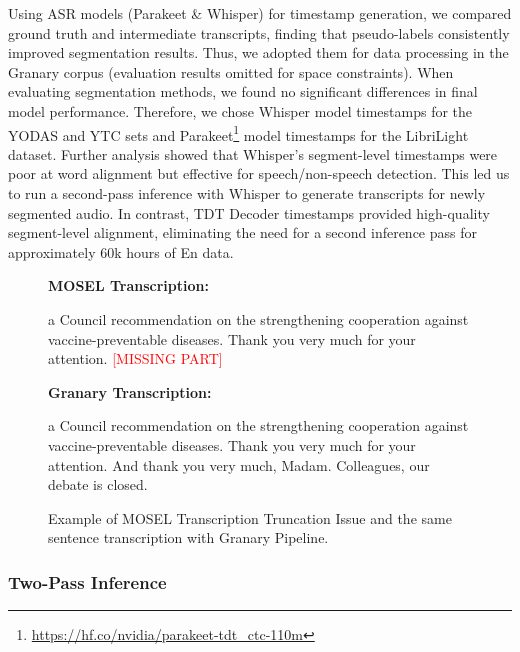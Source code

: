 Using ASR models (Parakeet\cite{rekesh2023fast} \& Whisper) for timestamp generation, we compared ground truth and intermediate transcripts, finding that pseudo-labels consistently improved segmentation results. Thus, we adopted them for data processing in the Granary corpus (evaluation results omitted for space constraints). When evaluating segmentation methods, we found no significant differences in final model performance. Therefore, we chose Whisper model timestamps for the YODAS and YTC sets and Parakeet\footnote{\url{https://hf.co/nvidia/parakeet-tdt_ctc-110m}} model timestamps for the LibriLight dataset. Further analysis showed that Whisper's segment-level timestamps were poor at word alignment but effective for speech/non-speech detection. This led us to run a second-pass inference with Whisper to generate transcripts for newly segmented audio. In contrast, TDT Decoder timestamps provided high-quality segment-level alignment, eliminating the need for a second inference pass for approximately 60k hours of En data.


\begin{figure}[htbp]
    \centering
    \caption{Example of MOSEL Transcription Truncation Issue and the same sentence transcription with Granary Pipeline.}
    \begin{tcolorbox}[
        colframe=black,
        colback=white,
        arc=2mm,
        width=\linewidth,
        boxrule=0.2mm,
    ]
    \textbf{MOSEL Transcription:}  

    a Council recommendation on the strengthening cooperation against vaccine-preventable diseases. Thank you very much for your attention. \textcolor{red}{{[MISSING PART]}}

    \vspace{0.5em}
    \textbf{Granary Transcription:}  

    a Council recommendation on the strengthening cooperation against vaccine-preventable diseases. Thank you very much for your attention. \textcolor[rgb]{0,0.5,0}{{And thank you very much, Madam. Colleagues, our debate is closed.}}
    \end{tcolorbox}
    \label{fig:mosel_transcription}
\end{figure}

\subsubsection{Two-Pass Inference}

